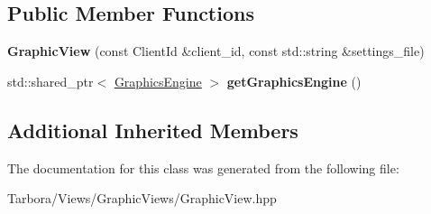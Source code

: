 \subsection*{Public Member Functions}
\begin{DoxyCompactItemize}
\item 
\mbox{\label{classTarbora_1_1GraphicView_aae376fc7aaccdad026f7c841f6577fa5}} 
{\bfseries Graphic\+View} (const Client\+Id \&client\+\_\+id, const std\+::string \&settings\+\_\+file)
\item 
\mbox{\label{classTarbora_1_1GraphicView_ad070d4538da994ad77f8fbfc5bd39763}} 
std\+::shared\+\_\+ptr$<$ \hyperlink{classTarbora_1_1GraphicsEngine}{Graphics\+Engine} $>$ {\bfseries get\+Graphics\+Engine} ()
\end{DoxyCompactItemize}
\subsection*{Additional Inherited Members}


The documentation for this class was generated from the following file\+:\begin{DoxyCompactItemize}
\item 
Tarbora/\+Views/\+Graphic\+Views/Graphic\+View.\+hpp\end{DoxyCompactItemize}
